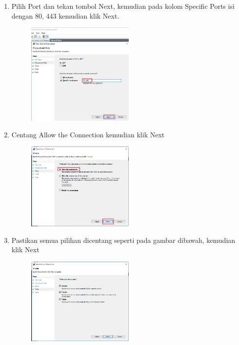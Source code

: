 \begin{enumerate}
	\item Pilih Port dan tekan tombol Next, kemudian pada kolom Specific Ports isi dengan 80, 443 kemudian klik Next.
		\begin{figure}[!htbp]
    		\centering
    		\includegraphics[width=0.5\textwidth]{figures/Xampp16.png}
    		\label{Xampp16}
		\end{figure}
		
	\item Centang Allow the Connection kemudian klik Next
		\begin{figure}[!htbp]
    		\centering
    		\includegraphics[width=0.5\textwidth]{figures/Xampp17.png}
    		\label{Xampp17}
		\end{figure}
		
	\item Pastikan semua pilihan dicentang seperti pada gambar dibawah, kemudian klik Next
		\begin{figure}[!htbp]
    		\centering
    		\includegraphics[width=0.5\textwidth]{figures/Xampp18.png}
    		\label{Xampp18}
		\end{figure}
		

\end{enumerate}
